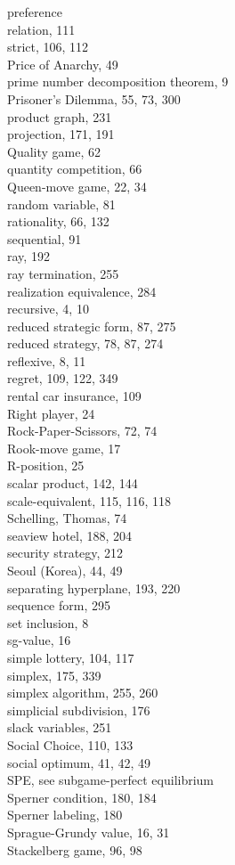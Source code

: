 \documentclass[12pt]{article}
\begin{document}
preference\\
relation, 111\\
strict, 106, 112\\
Price of Anarchy, 49\\
prime number decomposition theorem, 9\\
Prisoner's Dilemma, 55, 73, 300\\
product graph, 231\\
projection, 171, 191\\
Quality game, 62\\
quantity competition, 66\\
Queen-move game, 22, 34\\
random variable, 81\\
rationality, 66, 132\\
sequential, 91\\
ray, 192\\
ray termination, 255\\
realization equivalence, 284\\
recursive, 4, 10\\
reduced strategic form, 87, 275\\
reduced strategy, 78, 87, 274\\
reflexive, 8, 11\\
regret, 109, 122, 349\\
rental car insurance, 109\\
Right player, 24\\
Rock-Paper-Scissors, 72, 74\\
Rook-move game, 17\\
R-position, 25\\
scalar product, 142, 144\\
scale-equivalent, 115, 116, 118\\
Schelling, Thomas, 74\\
seaview hotel, 188, 204\\
security strategy, 212\\
Seoul (Korea), 44, 49\\
separating hyperplane, 193, 220\\
sequence form, 295\\
set inclusion, 8\\
sg-value, 16\\
simple lottery, 104, 117\\
simplex, 175, 339\\
simplex algorithm, 255, 260\\
simplicial subdivision, 176\\
slack variables, 251\\
Social Choice, 110, 133\\
social optimum, 41, 42, 49\\
SPE, see subgame-perfect equilibrium\\
Sperner condition, 180, 184\\
Sperner labeling, 180\\
Sprague-Grundy value, 16, 31\\
Stackelberg game, 96, 98
\end{document}
